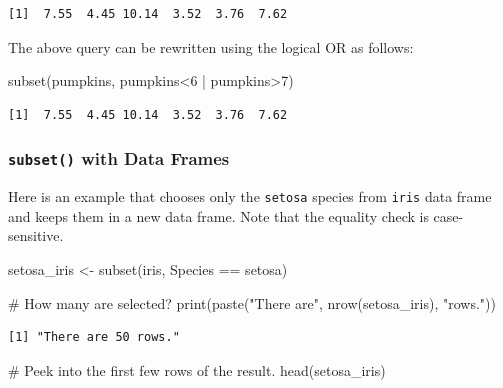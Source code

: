 \documentclass[
  letterpaper,
  DIV=11,
  numbers=noendperiod]{scrreprt}
\newenvironment{Shaded}{\begin{snugshade}}{\end{snugshade}}
\newcommand{\CommentTok}[1]{\textcolor[rgb]{0.37,0.37,0.37}{#1}}
\newcommand{\DecValTok}[1]{\textcolor[rgb]{0.68,0.00,0.00}{#1}}
\newcommand{\FunctionTok}[1]{\textcolor[rgb]{0.28,0.35,0.67}{#1}}
\newcommand{\NormalTok}[1]{\textcolor[rgb]{0.00,0.23,0.31}{#1}}
\newcommand{\OtherTok}[1]{\textcolor[rgb]{0.00,0.23,0.31}{#1}}
\newcommand{\SpecialCharTok}[1]{\textcolor[rgb]{0.37,0.37,0.37}{#1}}
\newcommand{\StringTok}[1]{\textcolor[rgb]{0.13,0.47,0.30}{#1}}
\begin{document}
\begin{verbatim}
[1]  7.55  4.45 10.14  3.52  3.76  7.62
\end{verbatim}

The above query can be rewritten using the logical OR as follows:

\begin{Shaded}
\begin{Highlighting}[]
\FunctionTok{subset}\NormalTok{(pumpkins, pumpkins}\SpecialCharTok{\textless{}}\DecValTok{6} \SpecialCharTok{|}\NormalTok{ pumpkins}\SpecialCharTok{\textgreater{}}\DecValTok{7}\NormalTok{)}
\end{Highlighting}
\end{Shaded}

\begin{verbatim}
[1]  7.55  4.45 10.14  3.52  3.76  7.62
\end{verbatim}

\subsubsection{\texorpdfstring{\texttt{subset()} with Data
Frames}{subset() with Data Frames}}\label{subset-with-data-frames}

Here is an example that chooses only the \texttt{setosa} species from
\texttt{iris} data frame and keeps them in a new data frame. Note that
the equality check is case-sensitive.

\begin{Shaded}
\begin{Highlighting}[]
\NormalTok{setosa\_iris }\OtherTok{\textless{}{-}} \FunctionTok{subset}\NormalTok{(iris, Species }\SpecialCharTok{==} \StringTok{\textquotesingle{}setosa\textquotesingle{}}\NormalTok{)}

\CommentTok{\# How many are selected?}
\FunctionTok{print}\NormalTok{(}\FunctionTok{paste}\NormalTok{(}\StringTok{"There are"}\NormalTok{, }\FunctionTok{nrow}\NormalTok{(setosa\_iris), }\StringTok{"rows."}\NormalTok{))}
\end{Highlighting}
\end{Shaded}

\begin{verbatim}
[1] "There are 50 rows."
\end{verbatim}

\begin{Shaded}
\begin{Highlighting}[]
\CommentTok{\# Peek into the first few rows of the result.}
\FunctionTok{head}\NormalTok{(setosa\_iris)}
\end{Highlighting}
\end{Shaded}
\end{document}
